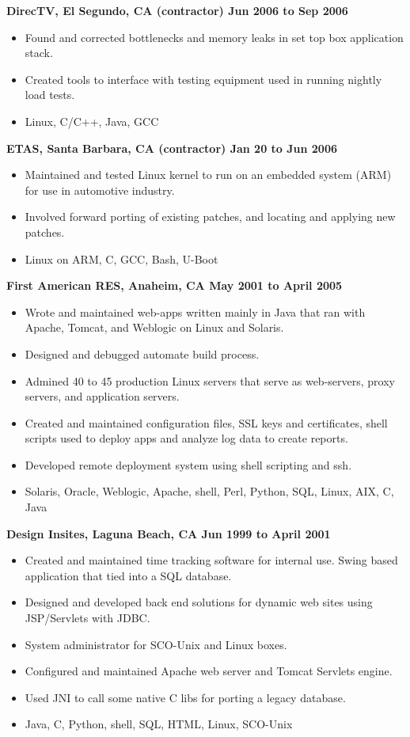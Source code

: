 \documentclass{res}
\begin{document}
\begin{resume}
{\large \bf DirecTV, El Segundo, CA (contractor) \hfill Jun 2006 to Sep 2006}

\begin{itemize}

\item Found and corrected bottlenecks and memory leaks in set top
box application stack.

\item Created tools to interface with testing equipment used in
running nightly load tests.

\item Linux, C/C++, Java, GCC
\end{itemize}

{\large \bf ETAS, Santa Barbara, CA (contractor) \hfill Jan 20 to Jun 2006}
\begin{itemize}
\item Maintained and tested Linux kernel to run on an embedded
system (ARM) for use in automotive industry.
\item Involved forward porting of existing patches, and locating and applying
new patches.
\item  Linux on ARM, C, GCC, Bash, U-Boot
\end{itemize}


{\large \bf First American RES, Anaheim, CA \hfill May 2001 to April 2005}
\begin{itemize}
\item Wrote and maintained web-apps written mainly in Java that ran
with Apache, Tomcat, and Weblogic on Linux and Solaris.
\item Designed and debugged automate build process.
\item Admined 40 to 45 production Linux servers that serve as
web-servers, proxy servers, and application servers.
\item Created and maintained configuration files,
SSL keys and certificates, shell scripts used to deploy apps and
analyze log data to create reports.
\item Developed remote deployment system using shell scripting and
ssh.
\item  Solaris, Oracle, Weblogic, Apache, shell, Perl, Python,
SQL, Linux, AIX, C, Java
\end{itemize}

{\large \bf Design Insites, Laguna Beach, CA \hfill Jun 1999 to April 2001}
\begin{itemize}
\item Created and maintained time tracking software for internal use.
Swing based application that tied into a SQL database.
\item Designed and developed back end solutions for dynamic web
sites using JSP/Servlets with JDBC.
\item System administrator for SCO-Unix and Linux boxes.
\item Configured and maintained Apache web server and Tomcat Servlets
engine.
\item Used JNI to call some native C libs for porting a legacy database.
\item  Java, C, Python, shell,  SQL, HTML, Linux, SCO-Unix
\end{itemize}


\end{resume}
\end{document}
